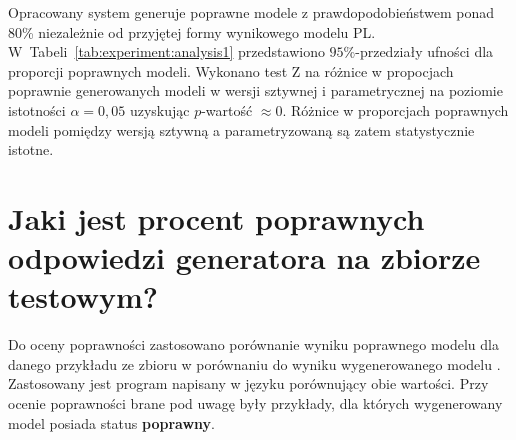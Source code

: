 Opracowany system generuje poprawne modele z prawdopodobieństwem ponad 80\% niezależnie od przyjętej formy wynikowego modelu PL. W~Tabeli~\ref{tab:experiment:analysis1} przedstawiono $95\%$-przedziały ufności dla proporcji poprawnych modeli. Wykonano test Z na różnice w propocjach poprawnie generowanych modeli w wersji sztywnej i parametrycznej na poziomie istotności $\alpha=0,05$ uzyskując $p$-wartość $\approx0$. %
 Różnice w proporcjach poprawnych modeli pomiędzy wersją sztywną a parametryzowaną są zatem statystycznie istotne.


\section{Jaki jest procent poprawnych odpowiedzi generatora na zbiorze testowym?}



Do oceny poprawności zastosowano porównanie wyniku poprawnego modelu  dla danego przykładu ze zbioru w porównaniu do wyniku wygenerowanego modelu . Zastosowany jest program napisany w języku  porównujący obie wartości. Przy ocenie poprawności brane pod uwagę były przykłady, dla których wygenerowany model posiada status \textbf{poprawny}.


